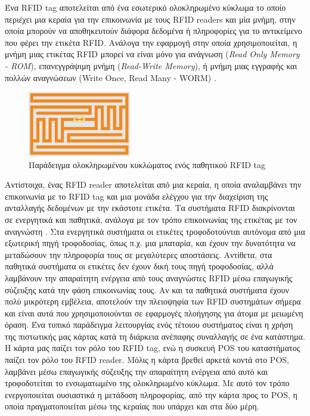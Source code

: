 Ένα RFID tag αποτελείται από ένα εσωτερικό ολοκληρωμένο κύκλωμα το οποίο περιέχει μια κεραία για την επικοινωνία με τους RFID readers και μία μνήμη, στην οποία μπορούν να αποθηκευτούν διάφορα δεδομένα ή πληροφορίες για το αντικείμενο που φέρει την ετικέτα RFID. Ανάλογα την εφαρμογή στην οποία χρησιμοποιείται, η μνήμη μιας ετικέτας RFID μπορεί να είναι μόνο για ανάγνωση (\textit{Read Only Memory - ROM}), επανεγγράψιμη μνήμη (\textit{Read-Write Memory}), ή μνήμη μιας εγγραφής και πολλών αναγνώσεων (Write Once, Read Many - WORM) \cite{bonsor_fenlon_2007}.

\begin{figure}[H]
    \centering
    \includegraphics[width=0.4\textwidth]{images/rfid_tag.png}
    \caption{Παράδειγμα ολοκληρωμένου κυκλώματος ενός παθητικού RFID tag}
    \label{fig:rfid-tag}
\end{figure}

Αντίστοιχα, ένας RFID reader αποτελείται από μια κεραία, η οποία αναλαμβάνει την επικοινωνία με το RFID tag και μια μονάδα ελέγχου για την διαχείριση της ανταλλαγής δεδομένων με την εκάστοτε ετικέτα. Τα συστήματα RFID διακρίνονται σε ενεργητικά και παθητικά, ανάλογα με τον τρόπο επικοινωνίας της ετικέτας με τον αναγνώστη \cite{ElProCus_rfid, kaur2011rfid}. Στα ενεργητικά συστήματα οι ετικέτες τροφοδοτούνται αυτόνομα από μια εξωτερική πηγή τροφοδοσίας, όπως π.χ. μια μπαταρία, και έχουν την δυνατότητα να μεταδώσουν την πληροφορία τους σε μεγαλύτερες αποστάσεις. Αντίθετα, στα παθητικά συστήματα οι ετικέτες δεν έχουν δική τους πηγή τροφοδοσίας, αλλά λαμβάνουν την απαραίτητη ενέργεια από τους αναγνώστες RFID μέσω επαγωγικής σύζευξης κατά την φάση επικοινωνίας τους. Αν και τα παθητικά συστήματα έχουν πολύ μικρότερη εμβέλεια, αποτελούν την πλειοψηφία των RFID συστημάτων σήμερα και είναι αυτά που χρησιμοποιούνται σε εφαρμογές πλοήγησης για άτομα με μειωμένη όραση. Ένα τυπικό παράδειγμα λειτουργίας ενός τέτοιου συστήματος είναι η χρήση της πιστωτικής μας κάρτας κατά τη διάρκεια ανέπαφης συναλλαγής σε ένα κατάστημα. Η κάρτα μας παίζει τον ρόλο του RFID tag, ενώ η συσκευή POS του καταστήματος παίζει τον ρόλο του RFID reader. Μόλις η κάρτα βρεθεί αρκετά κοντά στο POS, λαμβάνει μέσω επαγωγικής σύζευξης την απαραίτητη ενέργεια από αυτό και τροφοδοτείται το ενσωματωμένο της ολοκληρωμένο κύκλωμα. Με αυτό τον τρόπο ενεργοποιείται ουσιαστικά η μετάδοση πληροφορίας, από την κάρτα προς το POS, η οποία πραγματοποιείται μέσω της κεραίας που υπάρχει και στα δύο μέρη.

